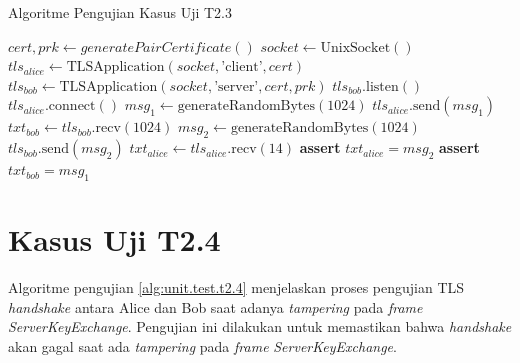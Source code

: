 \begin{algorithm}
  \caption{Algoritme Pengujian Kasus Uji T2.3}
  \label{alg:unit.test.t2.3}
  \begin{algorithmic}
    \State $cert, prk \gets generatePairCertificate()$
    \State $socket \gets \text{UnixSocket}()$ 
    \State $tls_{alice} \gets \text{TLSApplication}(socket, \text{'client'}, cert)$ 
    \State $tls_{bob} \gets \text{TLSApplication}(socket, \text{'server'}, cert, prk)$
    \State
    \State $tls_{bob}.\text{listen}()$  
    \State $tls_{alice}.\text{connect}()$  
    \State
    \State $msg_1 \gets \text{generateRandomBytes}(1024)$
    \State $tls_{alice}.\text{send}(msg_1)$
    \State $txt_{bob} \gets tls_{bob}.\text{recv}(1024)$
    \State
    \State $msg_2 \gets \text{generateRandomBytes}(1024)$
    \State $tls_{bob}.\text{send}(msg_2)$
    \State $txt_{alice} \gets tls_{alice}.\text{recv}(14)$
    \State
    \State \textbf{assert} $txt_{alice} = msg_2$
    \State \textbf{assert} $txt_{bob} = msg_1$
  \end{algorithmic}
\end{algorithm}

\section{Kasus Uji T2.4}

Algoritme pengujian \ref{alg:unit.test.t2.4} menjelaskan proses pengujian TLS \emph{handshake} antara Alice dan Bob saat adanya \emph{tampering} pada \emph{frame} \emph{ServerKeyExchange}. Pengujian ini dilakukan untuk memastikan bahwa \emph{handshake} akan gagal saat ada \emph{tampering} pada \emph{frame} \emph{ServerKeyExchange}. 

